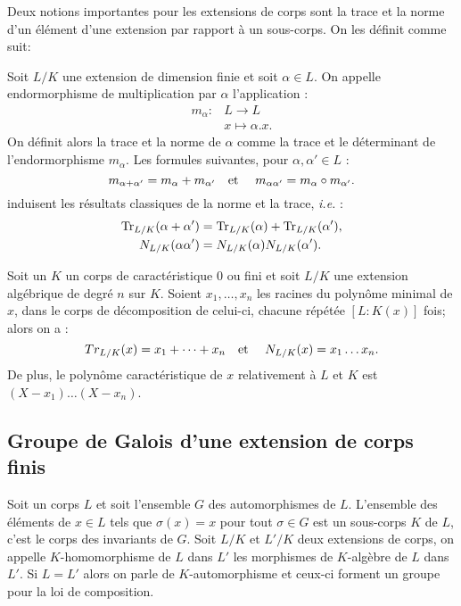 \documentclass[a4paper]{article} %
\numberwithin{section}{part}
\numberwithin{equation}{section}
\newcommand\etmath{\textup{\quad et \quad}}
\begin{document}

Deux notions importantes pour les extensions de corps sont la trace et la norme
d'un élément d'une extension par rapport à un sous-corps. On les définit comme
suit:

\begin{defn}
Soit $L/K$ une extension de dimension finie et soit $\alpha\in L$. On appelle
endormorphisme de multiplication par $\alpha$ l'application :
\begin{align*}
m_{\alpha} :&L \longrightarrow L\\
&x\longmapsto\alpha.x.
\end{align*}
On définit alors la trace et la norme de $\alpha$ comme la trace et le 
déterminant de l'endormorphisme $m_{\alpha}$. Les formules suivantes, pour 
$\alpha, \alpha'\in L$ :
\begin{equation}
m_{\alpha + \alpha'} = m_{\alpha} + m_{\alpha'} \etmath
m_{\alpha\alpha'} = m_{\alpha}\circ m_{\alpha'}. 
\end{equation}
induisent les résultats classiques de la norme et la trace, \textit{i.e.} :
\begin{align}
\textup{Tr}_{L/K}(\alpha + \alpha') &= \textup{Tr}_{L/K}(\alpha) +
\textup{Tr}_{L/K}(\alpha'),\\
N_{L/K}(\alpha\alpha') &= N_{L/K}(\alpha)N_{L/K}(\alpha').
\end{align}
\end{defn}

\begin{prop}
Soit un $K$ un corps de caractéristique 0 ou fini et soit $L/K$ une extension
algébrique de degré $n$ sur $K$. Soient $x_1,\dots, x_n$ les racines du polynôme
minimal de $x$, dans le corps de décomposition de celui-ci, chacune répétée 
$[L:K(x)]$ fois; alors on a :
\begin{equation}
Tr_{L/K}(x) = x_1 + \dots + x_n \etmath N_{L/K}(x) = x_1\dots x_n.
\end{equation}
De plus, le polynôme caractéristique de $x$ relativement à $L$ et $K$ est $(X -
x_1)\dots(X - x_n)$.
\end{prop}

\subsection{Groupe de Galois d'une extension de corps finis}
Soit un corps $L$ et soit l'ensemble $G$ des automorphismes de $L$. L'ensemble 
des éléments de $x\in L$ tels que $\sigma(x) = x$ pour tout $\sigma\in G$ est un
sous-corps $K$ de $L$, c'est le corps des invariants de $G$. Soit $L/K$ et
$L'/K$ deux extensions de corps, on appelle $K$-homomorphisme de $L$ dans $L'$ 
les morphismes de $K$-algèbre de $L$ dans $L'$. Si $L = L'$ alors on parle de
$K$-automorphisme et ceux-ci forment un groupe pour la loi de composition.
\end{document}
